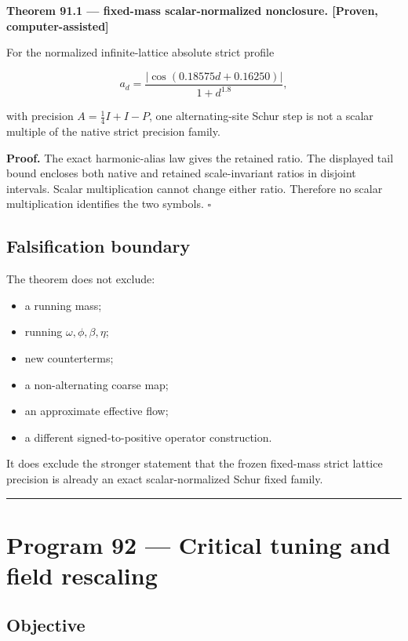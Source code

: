 \documentclass[11pt,a4paper,openany]{report}
\newcommand{\statusComputer}{\textcolor{fingreen}{[Proven, computer-assisted]}}
\begin{document}
\textbf{Theorem 91.1 --- fixed-mass scalar-normalized nonclosure. \statusComputer{}}

For the normalized infinite-lattice absolute strict profile

\[
a_d=\frac{|\cos(0.18575d+0.16250)|}{1+d^{1.8}},
\]

with precision \(A=\frac14 I+I-P\), one alternating-site Schur step is not a scalar multiple of the native strict precision family.

\textbf{Proof.} The exact harmonic-alias law gives the retained ratio. The displayed tail bound encloses both native and retained scale-invariant ratios in disjoint intervals. Scalar multiplication cannot change either ratio. Therefore no scalar multiplication identifies the two symbols. \(\square\)

\section{Falsification boundary}

The theorem does not exclude:

\begin{itemize}
\item 
a running mass;

\item 
running \(\omega,\phi,\beta,\eta\);

\item 
new counterterms;

\item 
a non-alternating coarse map;

\item 
an approximate effective flow;

\item 
a different signed-to-positive operator construction.

\end{itemize}

It does exclude the stronger statement that the frozen fixed-mass strict lattice precision is already an exact scalar-normalized Schur fixed family.

\par\medskip\hrule\medskip

\chapter{Program 92 --- Critical tuning and field rescaling}

\section{Objective}
\end{document}
